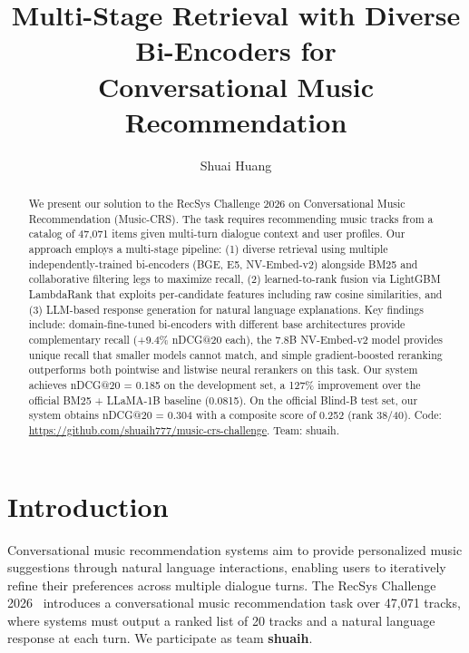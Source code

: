 \documentclass[sigconf]{acmart}
\begin{document}
\title{Multi-Stage Retrieval with Diverse Bi-Encoders for\\Conversational Music Recommendation}

\author{Shuai Huang}

\begin{abstract}
We present our solution to the RecSys Challenge 2026 on Conversational Music Recommendation (Music-CRS). The task requires recommending music tracks from a catalog of 47,071 items given multi-turn dialogue context and user profiles. Our approach employs a multi-stage pipeline: (1) diverse retrieval using multiple independently-trained bi-encoders (BGE, E5, NV-Embed-v2) alongside BM25 and collaborative filtering legs to maximize recall, (2) learned-to-rank fusion via LightGBM LambdaRank that exploits per-candidate features including raw cosine similarities, and (3) LLM-based response generation for natural language explanations. Key findings include: domain-fine-tuned bi-encoders with different base architectures provide complementary recall (+9.4\% nDCG@20 each), the 7.8B NV-Embed-v2 model provides unique recall that smaller models cannot match, and simple gradient-boosted reranking outperforms both pointwise and listwise neural rerankers on this task. Our system achieves nDCG@20 = 0.185 on the development set, a 127\% improvement over the official BM25 + LLaMA-1B baseline (0.0815). On the official Blind-B test set, our system obtains nDCG@20 = 0.304 with a composite score of 0.252 (rank 38/40). Code: \url{https://github.com/shuaih777/music-crs-challenge}. Team: shuaih.
\end{abstract}

\maketitle

\section{Introduction}

Conversational music recommendation systems aim to provide personalized music suggestions through natural language interactions, enabling users to iteratively refine their preferences across multiple dialogue turns. The RecSys Challenge 2026~\cite{recsys2026} introduces a conversational music recommendation task over 47,071 tracks, where systems must output a ranked list of 20 tracks and a natural language response at each turn. We participate as team \textbf{shuaih}.
\end{document}
